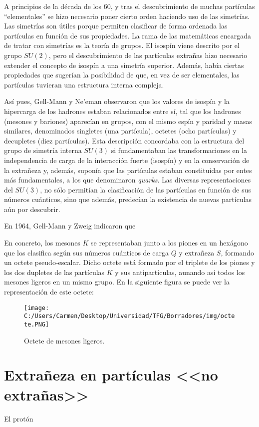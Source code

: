 A principios de la década de los 60, y tras el descubrimiento de muchas partículas ``elementales'' se hizo necesario poner cierto orden haciendo uso de las simetrías. Las simetrías son útiles porque permiten clasificar de forma ordenada las partículas en función de sus propiedades. La rama de las matemáticas encargada de tratar con simetrías es la teoría de grupos. El isospín viene descrito por el grupo $SU(2)$, pero el descubrimiento de las partículas extrañas hizo necesario extender el concepto de isospín a una simetría superior. Además, había ciertas propiedades que sugerían la posibilidad de que, en vez de ser elementales, las partículas tuvieran una estructura interna compleja. 

Así pues, Gell-Mann y Ne'eman observaron que los valores de isospín y la hipercarga de los hadrones estaban relacionados entre sí, tal que los hadrones (mesones y bariones) aparecían en grupos, con el mismo espín y paridad y masas similares, denominados singletes (una partícula), octetes (ocho partículas) y decupletes (diez partículas). Esta descripción concordaba con la estructura del grupo de simetría interna $SU(3)$ si fundamentaban las transformaciones en la independencia de carga de la interacción fuerte (isospín) y en la conservación de la extrañeza y, además, suponía que las partículas estaban constituidas por entes más fundamentales, a los que denominaron \textit{quarks}. \cite{notas2020}
Las diversas representaciones del $SU(3)$, no sólo permitían la clasificación de las partículas en función de sus números cuánticos, sino que además, predecían la existencia de nuevas partículas aún por descubrir. 

En 1964, Gell-Mann y Zweig indicaron que

En concreto, los mesones $K$ se representaban junto a los piones en un hexágono que los clasifica según sus números cuánticos de carga $Q$ y extrañeza $S$, formando un octete pseudo-escalar. Dicho octete está formado por el triplete de los piones y los dos dupletes de las partículas $K$ y sus antipartículas, aunando así todos los mesones ligeros en un mismo grupo. En la siguiente figura se puede ver la representación de este octete:

\begin{figure}[h]
	\centering
	\texttt{[image: C:/Users/Carmen/Desktop/Universidad/TFG/Borradores/img/octete.PNG]}
	\caption[Octete de mesones ligeros]
	{Octete de mesones ligeros. \cite{Griffiths2008}}
	\label{fig:octete}
\end{figure}



\section{Extrañeza en partículas <<no extrañas>>}
\label{cap:non-strange_particles}
El protón
